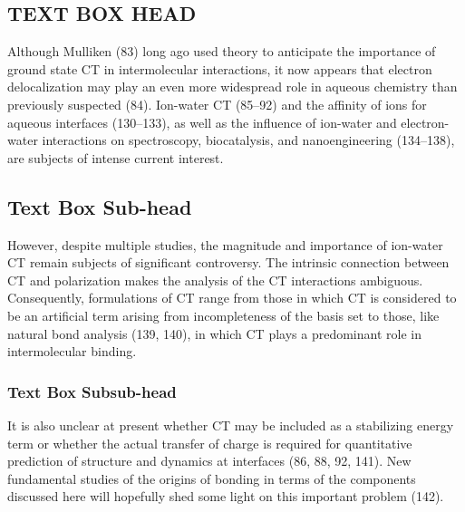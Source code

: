 \documentclass{ar-1col}
\begin{document}
\begin{textbox}
\section{TEXT BOX HEAD}
Although Mulliken (83) long ago used theory to anticipate the importance of ground state CT in intermolecular interactions, it now appears that electron delocalization may play an even more widespread role in aqueous chemistry than previously suspected (84). Ion-water CT (85--92) and the affinity of ions for aqueous interfaces (130--133), as well as the influence of ion-water and electron-water interactions on spectroscopy, biocatalysis, and nanoengineering (134--138), are subjects of intense current interest.
\subsection{Text Box Sub-head}
However, despite multiple studies, the magnitude and importance of ion-water CT remain subjects of significant controversy. The intrinsic connection between CT and polarization makes the analysis of the CT interactions ambiguous. Consequently, formulations of CT range from those in which CT is considered to be an artificial term arising from incompleteness of the basis set to those, like natural bond analysis (139, 140), in which CT plays a predominant role in intermolecular binding.
\subsubsection{Text Box Subsub-head}
It is also unclear at present whether CT may be included as a stabilizing energy term or whether the actual transfer of charge is required for quantitative prediction of structure and dynamics at interfaces (86, 88, 92, 141). New fundamental studies of the origins of bonding in terms of the components discussed here will hopefully shed some light on this important problem (142).
\end{textbox}


\end{document}
